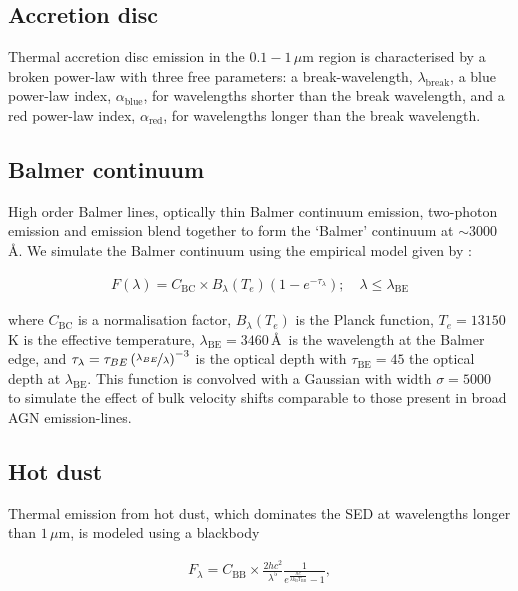 \subsection{Accretion disc}

Thermal accretion disc emission in the $0.1 - 1$\,$\mu$m region is characterised by a broken power-law with three free parameters: a break-wavelength, $\lambda_{\text{break}}$, a blue power-law index, $\alpha_{\text{blue}}$, for wavelengths shorter than the break wavelength, and a red power-law index, $\alpha_{\text{red}}$, for wavelengths longer than the break wavelength.

\subsection{Balmer continuum}

High order Balmer lines, optically thin Balmer continuum emission, two-photon emission and  emission blend together to form the `Balmer' continuum at $\sim3000$\,\AA.
We simulate the Balmer continuum using the empirical model given by \citet{grandi82}: 

\begingroup\makeatletter{}\check@mathfonts
\begin{eqnarray}
  F(\lambda) = C_{\text{BC}} \times B_\lambda(T_e)(1-e^{-\tau_\lambda}); \quad \lambda \leq \lambda_{\text{BE}}
\end{eqnarray}
\endgroup

\noindent where $C_{\text{BC}}$ is a normalisation factor, $B_\lambda(T_e)$ is the Planck function, $T_e=13150$\,K is the effective temperature, $\lambda_{\text{BE}}=3460$\,\AA\, is the wavelength at the Balmer edge, and $\tau_\lambda = \tau_{BE}\left( \nicefrac{\lambda_{BE}} {\lambda} \right)^{-3}$ is the optical depth with $\tau_{\text{BE}}=45$ the optical depth at $\lambda_{\text{BE}}$. 
This function is convolved with a Gaussian with width $\sigma=5000$\,\kms\, to simulate the effect of bulk velocity shifts comparable to those present in broad AGN emission-lines. 

\subsection{Hot dust}

Thermal emission from hot dust, which dominates the SED at wavelengths longer than $1$\,$\mu$m, is modeled using a blackbody

\begingroup\makeatletter{}\check@mathfonts
\begin{eqnarray}  
  F_\lambda = C_{\text{BB}} \times \frac{2 hc^2}{\lambda^5}\frac{1}{ e^{\frac{hc}{\lambda k_\text{B}T_{\text{BB}}}} - 1}, 
\end{eqnarray}
\endgroup

